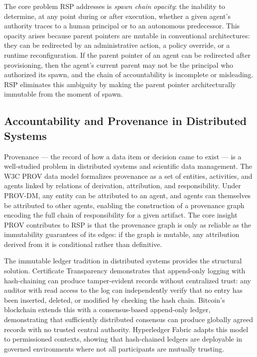 The core problem RSP addresses is \emph{spawn chain opacity}: the inability to determine, at any point during or after execution, whether a given agent's authority traces to a human principal or to an autonomous predecessor. This opacity arises because parent pointers are mutable in conventional architectures: they can be redirected by an administrative action, a policy override, or a runtime reconfiguration. If the parent pointer of an agent can be redirected after provisioning, then the agent's current parent may not be the principal who authorized its spawn, and the chain of accountability is incomplete or misleading. RSP eliminates this ambiguity by making the parent pointer architecturally immutable from the moment of spawn.

\subsection{Accountability and Provenance in Distributed Systems}

Provenance --- the record of how a data item or decision came to exist --- is a well-studied problem in distributed systems and scientific data management. The W3C PROV data model \cite{moreau2015-prov} formalizes provenance as a set of entities, activities, and agents linked by relations of derivation, attribution, and responsibility. Under PROV-DM, any entity can be attributed to an agent, and agents can themselves be attributed to other agents, enabling the construction of a provenance graph encoding the full chain of responsibility for a given artifact. The core insight PROV contributes to RSP is that the provenance graph is only as reliable as the immutability guarantees of its edges: if the graph is mutable, any attribution derived from it is conditional rather than definitive.

The immutable ledger tradition in distributed systems provides the structural solution. Certificate Transparency \cite{laurie2013certificate} demonstrates that append-only logging with hash-chaining can produce tamper-evident records without centralized trust: any auditor with read access to the log can independently verify that no entry has been inserted, deleted, or modified by checking the hash chain. Bitcoin's blockchain \cite{nakamoto2008bitcoin} extends this with a consensus-based append-only ledger, demonstrating that sufficiently distributed consensus can produce globally agreed records with no trusted central authority. Hyperledger Fabric \cite{hyperledger2015} adapts this model to permissioned contexts, showing that hash-chained ledgers are deployable in governed environments where not all participants are mutually trusting.

